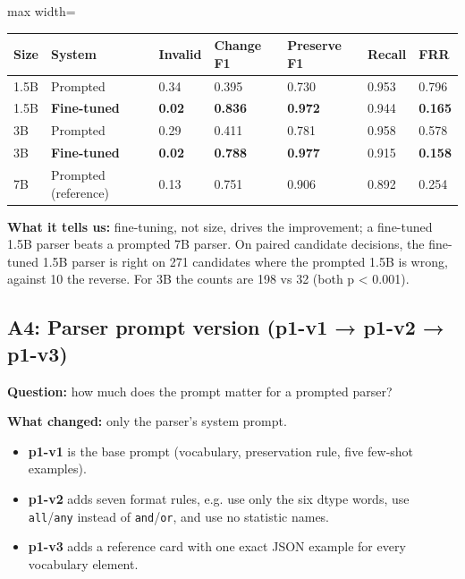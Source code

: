\documentclass[11pt]{article}
\providecommand{\tightlist}{\setlength{\itemsep}{0pt}\setlength{\parskip}{0pt}}
\begin{document}
\begin{table}[!tp]
\centering\footnotesize\setlength{\tabcolsep}{3pt}\renewcommand{\arraystretch}{1.1}
\begin{adjustbox}{max width=\textwidth}\begin{tabular}{lllllll}
\toprule
\textbf{Size} & \textbf{System} & \textbf{Invalid} & \textbf{Change F1} & \textbf{Preserve F1} & \textbf{Recall} & \textbf{FRR} \\
\midrule
1.5B & Prompted & 0.34 & 0.395 & 0.730 & 0.953 & 0.796 \\
1.5B & \textbf{Fine-tuned} & \textbf{0.02} & \textbf{0.836} & \textbf{0.972} & 0.944 & \textbf{0.165} \\
3B & Prompted & 0.29 & 0.411 & 0.781 & 0.958 & 0.578 \\
3B & \textbf{Fine-tuned} & \textbf{0.02} & \textbf{0.788} & \textbf{0.977} & 0.915 & \textbf{0.158} \\
7B & Prompted (reference) & 0.13 & 0.751 & 0.906 & 0.892 & 0.254 \\
\bottomrule
\end{tabular}\end{adjustbox}
\end{table}

\textbf{What it tells us:} fine-tuning, not size, drives the
improvement; a fine-tuned 1.5B parser beats a prompted 7B parser. On
paired candidate decisions, the fine-tuned 1.5B parser is right on 271
candidates where the prompted 1.5B is wrong, against 10 the reverse. For
3B the counts are 198 vs 32 (both p \textless{} 0.001).

\subsection{A4: Parser prompt version (p1-v1 → p1-v2 → p1-v3)}

\textbf{Question:} how much does the prompt matter for a prompted
parser?

\textbf{What changed:} only the parser's system prompt.

\begin{itemize}
\tightlist
\item
  \textbf{p1-v1} is the base prompt (vocabulary, preservation rule, five
  few-shot examples).
\item
  \textbf{p1-v2} adds seven format rules, e.g. use only the six dtype
  words, use \texttt{all}/\texttt{any} instead of
  \texttt{and}/\texttt{or}, and use no statistic names.
\item
  \textbf{p1-v3} adds a reference card with one exact JSON example for
  every vocabulary element.
\end{itemize}
\end{document}
